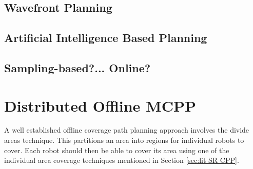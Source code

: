 \subsection{Wavefront Planning}
\subsection{Artificial Intelligence Based Planning}
\subsection{Sampling-based?... Online?}
\section{Distributed Offline MCPP}
\label{sec:lit Ditributed MCPP}
A well established offline coverage path planning approach involves the divide areas technique. This partitions an area into regions for individual robots to cover. Each robot should then be able to cover its area using one of the individual area coverage techniques mentioned in Section \ref{sec:lit SR CPP}.
